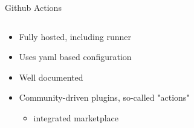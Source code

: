\documentclass[compress,aspectratio=169]{beamer}
\begin{document}
\begin{frame}{Github Actions}
\begin{columns}
\begin{column}{0.5\textwidth}
\begin{itemize}
          \item Fully hosted, including runner
          \item Uses yaml based configuration
          \item Well documented
          \item Community-driven plugins, so-called "actions"
            \begin{itemize}
              \item integrated marketplace
            \end{itemize}
        \end{itemize}
      \end{column}
    \end{columns}
	\end{frame}

\end{document}
